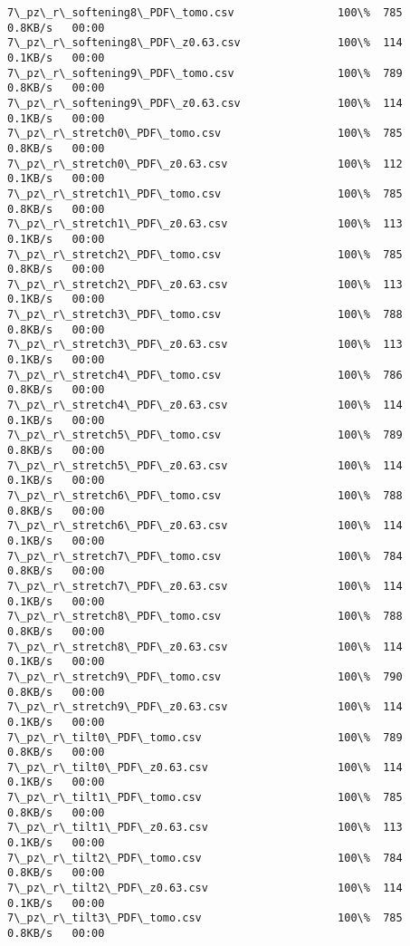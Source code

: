\documentclass[11pt]{article}
\begin{document}
\begin{Verbatim}[commandchars=\\\{\}]
7\_pz\_r\_softening8\_PDF\_tomo.csv                100\%  785     0.8KB/s   00:00    
7\_pz\_r\_softening8\_PDF\_z0.63.csv               100\%  114     0.1KB/s   00:00    
7\_pz\_r\_softening9\_PDF\_tomo.csv                100\%  789     0.8KB/s   00:00    
7\_pz\_r\_softening9\_PDF\_z0.63.csv               100\%  114     0.1KB/s   00:00    
7\_pz\_r\_stretch0\_PDF\_tomo.csv                  100\%  785     0.8KB/s   00:00    
7\_pz\_r\_stretch0\_PDF\_z0.63.csv                 100\%  112     0.1KB/s   00:00    
7\_pz\_r\_stretch1\_PDF\_tomo.csv                  100\%  785     0.8KB/s   00:00    
7\_pz\_r\_stretch1\_PDF\_z0.63.csv                 100\%  113     0.1KB/s   00:00    
7\_pz\_r\_stretch2\_PDF\_tomo.csv                  100\%  785     0.8KB/s   00:00    
7\_pz\_r\_stretch2\_PDF\_z0.63.csv                 100\%  113     0.1KB/s   00:00    
7\_pz\_r\_stretch3\_PDF\_tomo.csv                  100\%  788     0.8KB/s   00:00    
7\_pz\_r\_stretch3\_PDF\_z0.63.csv                 100\%  113     0.1KB/s   00:00    
7\_pz\_r\_stretch4\_PDF\_tomo.csv                  100\%  786     0.8KB/s   00:00    
7\_pz\_r\_stretch4\_PDF\_z0.63.csv                 100\%  114     0.1KB/s   00:00    
7\_pz\_r\_stretch5\_PDF\_tomo.csv                  100\%  789     0.8KB/s   00:00    
7\_pz\_r\_stretch5\_PDF\_z0.63.csv                 100\%  114     0.1KB/s   00:00    
7\_pz\_r\_stretch6\_PDF\_tomo.csv                  100\%  788     0.8KB/s   00:00    
7\_pz\_r\_stretch6\_PDF\_z0.63.csv                 100\%  114     0.1KB/s   00:00    
7\_pz\_r\_stretch7\_PDF\_tomo.csv                  100\%  784     0.8KB/s   00:00    
7\_pz\_r\_stretch7\_PDF\_z0.63.csv                 100\%  114     0.1KB/s   00:00    
7\_pz\_r\_stretch8\_PDF\_tomo.csv                  100\%  788     0.8KB/s   00:00    
7\_pz\_r\_stretch8\_PDF\_z0.63.csv                 100\%  114     0.1KB/s   00:00    
7\_pz\_r\_stretch9\_PDF\_tomo.csv                  100\%  790     0.8KB/s   00:00    
7\_pz\_r\_stretch9\_PDF\_z0.63.csv                 100\%  114     0.1KB/s   00:00    
7\_pz\_r\_tilt0\_PDF\_tomo.csv                     100\%  789     0.8KB/s   00:00    
7\_pz\_r\_tilt0\_PDF\_z0.63.csv                    100\%  114     0.1KB/s   00:00    
7\_pz\_r\_tilt1\_PDF\_tomo.csv                     100\%  785     0.8KB/s   00:00    
7\_pz\_r\_tilt1\_PDF\_z0.63.csv                    100\%  113     0.1KB/s   00:00    
7\_pz\_r\_tilt2\_PDF\_tomo.csv                     100\%  784     0.8KB/s   00:00    
7\_pz\_r\_tilt2\_PDF\_z0.63.csv                    100\%  114     0.1KB/s   00:00    
7\_pz\_r\_tilt3\_PDF\_tomo.csv                     100\%  785     0.8KB/s   00:00    

\end{Verbatim}
\end{document}
